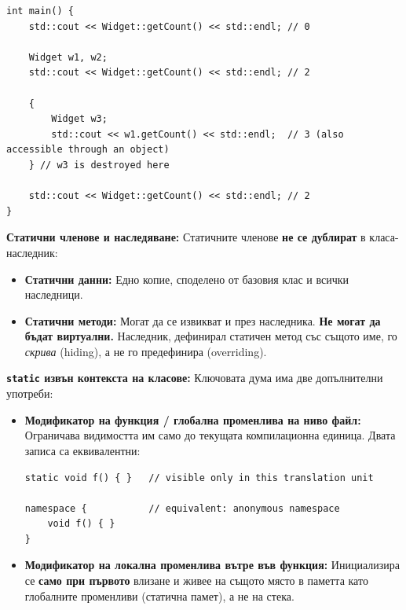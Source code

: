 \documentclass{scrartcl}
\begin{document}
\begin{FlushLeft}
\begin{lstlisting}
int main() {
    std::cout << Widget::getCount() << std::endl; // 0

    Widget w1, w2;
    std::cout << Widget::getCount() << std::endl; // 2

    {
        Widget w3;
        std::cout << w1.getCount() << std::endl;  // 3 (also accessible through an object)
    } // w3 is destroyed here

    std::cout << Widget::getCount() << std::endl; // 2
}
\end{lstlisting}

\textbf{Статични членове и наследяване:} Статичните членове \textbf{не се дублират} в класа-наследник:
\begin{itemize}
    \item \textbf{Статични данни:} Едно копие, споделено от базовия клас и всички наследници.
    \item \textbf{Статични методи:} Могат да се извикват и през наследника. \textbf{Не могат да бъдат виртуални.} Наследник, дефинирал статичен метод със същото име, го \textit{скрива} (hiding), а не го предефинира (overriding).
\end{itemize}

\textbf{\texttt{static} извън контекста на класове:} Ключовата дума има две допълнителни употреби:
\begin{itemize}
    \item \textbf{Модификатор на функция / глобална променлива на ниво файл:} Ограничава видимостта им само до текущата компилационна единица. Двата записа са еквивалентни:
\begin{lstlisting}
static void f() { }   // visible only in this translation unit

namespace {           // equivalent: anonymous namespace
    void f() { }
}
\end{lstlisting}
    \item \textbf{Модификатор на локална променлива вътре във функция:} Инициализира се \textbf{само при първото} влизане и живее на същото място в паметта като глобалните променливи (статична памет), а не на стека.
\end{itemize}

\end{FlushLeft}
\end{document}
